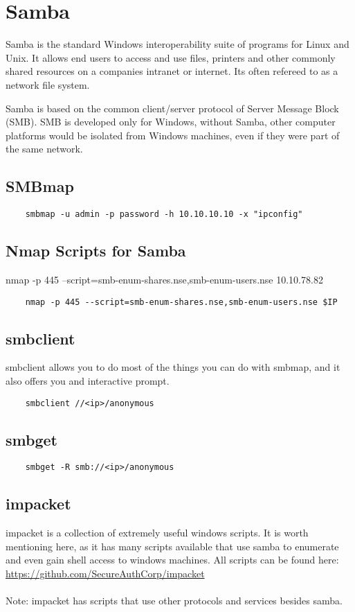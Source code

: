 \documentclass[12pt,a4paper]{scrartcl}
\begin{document}
\section{Samba}
Samba is the standard Windows interoperability suite of programs for Linux and Unix. It allows end users to access and use files, printers and other commonly shared resources on a companies intranet or internet. Its often refereed to as a network file system.

Samba is based on the common client/server protocol of Server Message Block (SMB). SMB is developed only for Windows, without Samba, other computer platforms would be isolated from Windows machines, even if they were part of the same network.
\subsection{SMBmap}
\begin{lstlisting}
	smbmap -u admin -p password -h 10.10.10.10 -x "ipconfig"
\end{lstlisting}

\subsection{Nmap Scripts for Samba}
nmap -p 445 --script=smb-enum-shares.nse,smb-enum-users.nse 10.10.78.82
\begin{lstlisting}
	nmap -p 445 --script=smb-enum-shares.nse,smb-enum-users.nse $IP
\end{lstlisting}

\subsection{smbclient}
smbclient allows you to do most of the things you can do with smbmap, and it also offers you and interactive prompt.
\begin{lstlisting}
	smbclient //<ip>/anonymous
\end{lstlisting}

\subsection{smbget}
\begin{lstlisting}
	smbget -R smb://<ip>/anonymous
\end{lstlisting}

\subsection{impacket}
impacket is a collection of extremely useful windows scripts. It is worth mentioning here, as it has many scripts available that use samba to enumerate and even gain shell access to windows machines. All scripts can be found here:\\ \url{https://github.com/SecureAuthCorp/impacket}\\\\
Note: impacket has scripts that use other protocols and services besides samba.
\end{document}
